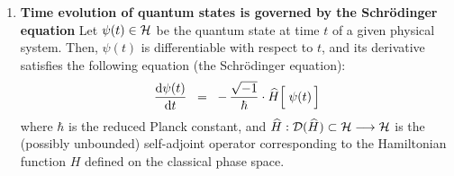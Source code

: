 \begin{enumerate}
\vskip 0.3cm
\item
	\textbf{Time evolution of quantum states is governed by the Schr\"{o}dinger equation}
	\vskip 0.05cm
	Let $\psi(t) \in \mathcal{H}$ be the quantum state at time $t$ of a given physical system.
	Then, $\psi(t)$ is differentiable with respect to $t$, and its derivative satisfies
	the following equation (the Schr\"{o}dinger equation):
	\begin{equation*}
	\dfrac{\d\psi(t)}{\d t}
	\;\; = \;\;
		-\,\dfrac{\sqrt{-1}}{\hbar}\cdot\widehat{H}\!\left[\;\overset{{\color{white}.}}{\psi(t)}\,\right]
	\end{equation*}
	where $\hbar$ is the reduced Planck constant, and
	$\widehat{H} : \mathcal{D}(\widehat{H}) \subset \mathcal{H} \longrightarrow \mathcal{H}$
	is the (possibly unbounded) self-adjoint operator
	corresponding to the Hamiltonian function $H$ defined on the classical phase space.

\end{enumerate}




